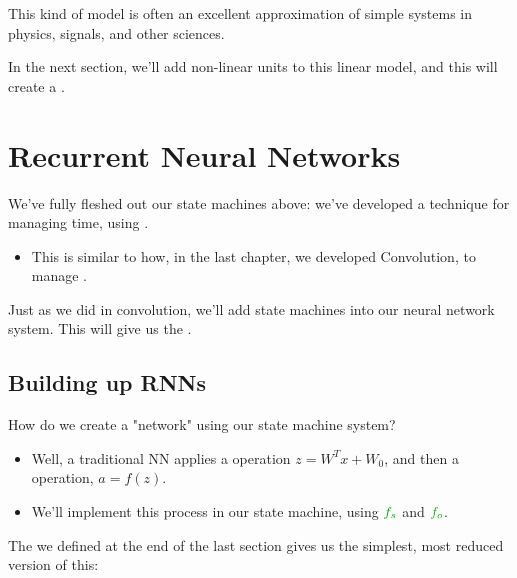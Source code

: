         

        This kind of model is often an excellent approximation of simple systems in physics, signals, and other sciences.

        \subsecdiv

        In the next section, we'll add non-linear units to this linear model, and this will create a .\\

\pagebreak

\section{Recurrent Neural Networks}

    We've fully fleshed out our state machines above: we've developed a technique for managing time, using .

    \begin{itemize}
        \item This is similar to how, in the last chapter, we developed Convolution, to manage .
    \end{itemize}

    Just as we did in convolution, we'll add state machines into our neural network system. This will give us the .



    \phantom{}

    \subsection{Building up RNNs}

        How do we create a "network" using our state machine system?

        \begin{itemize}
            \item  Well, a traditional NN applies a  operation $z=W^Tx+W_0$, and then a  operation, $a=f(z)$.
            
            \item We'll implement this process in our state machine, using $\grn{f_s}$ and $\grn{f_o}$.
        \end{itemize}

        The  we defined at the end of the last section gives us the simplest, most reduced version of this:

